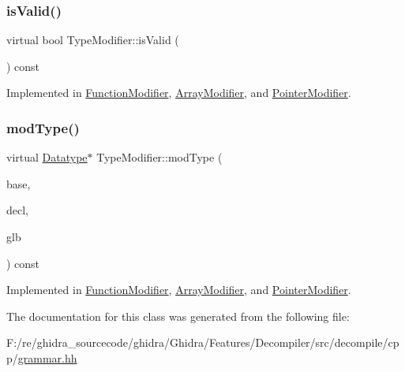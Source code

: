 \mbox{\label{class_type_modifier_a67477f048c4ede6b0a0419bf399f2113}} 
\subsubsection{\texorpdfstring{isValid()}{isValid()}}
{\footnotesize\ttfamily virtual bool Type\+Modifier\+::is\+Valid (\begin{DoxyParamCaption}\item[{void}]{ }\end{DoxyParamCaption}) const\hspace{0.3cm}{\ttfamily [pure virtual]}}



Implemented in \mbox{\hyperlink{class_function_modifier_a3ce17649de258e786a221834a225e806}{Function\+Modifier}}, \mbox{\hyperlink{class_array_modifier_ac9ad18fe0ecb33f70808ba1ca8acd574}{Array\+Modifier}}, and \mbox{\hyperlink{class_pointer_modifier_ae1220f9b7a325ac324fcfcf731f9c4cc}{Pointer\+Modifier}}.

\mbox{\label{class_type_modifier_aa476545f31ae45f4bd39c8afb7403406}} 
\subsubsection{\texorpdfstring{modType()}{modType()}}
{\footnotesize\ttfamily virtual \mbox{\hyperlink{class_datatype}{Datatype}}$\ast$ Type\+Modifier\+::mod\+Type (\begin{DoxyParamCaption}\item[{\mbox{\hyperlink{class_datatype}{Datatype}} $\ast$}]{base,  }\item[{const \mbox{\hyperlink{class_type_declarator}{Type\+Declarator}} $\ast$}]{decl,  }\item[{\mbox{\hyperlink{class_architecture}{Architecture}} $\ast$}]{glb }\end{DoxyParamCaption}) const\hspace{0.3cm}{\ttfamily [pure virtual]}}



Implemented in \mbox{\hyperlink{class_function_modifier_ac60a79708a408ad683a70e6f3310394c}{Function\+Modifier}}, \mbox{\hyperlink{class_array_modifier_a6e94c75eabef7320f99e2817ea62fc00}{Array\+Modifier}}, and \mbox{\hyperlink{class_pointer_modifier_a75a8aa9b1a6c8b9b4590a1b13f7b1f7a}{Pointer\+Modifier}}.



The documentation for this class was generated from the following file\+:\begin{DoxyCompactItemize}
\item 
F\+:/re/ghidra\+\_\+sourcecode/ghidra/\+Ghidra/\+Features/\+Decompiler/src/decompile/cpp/\mbox{\hyperlink{grammar_8hh}{grammar.\+hh}}\end{DoxyCompactItemize}
